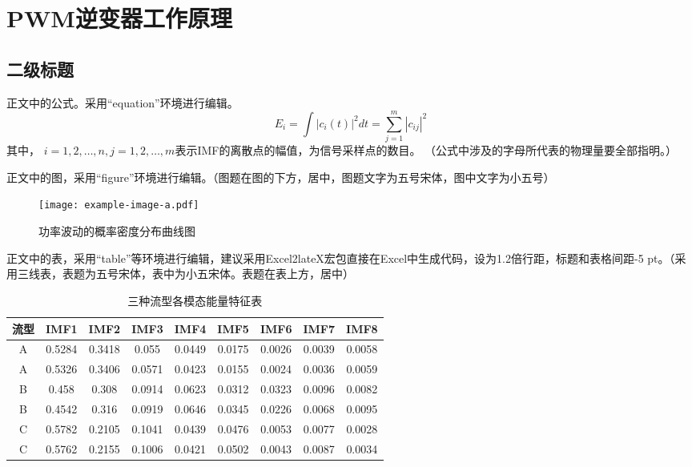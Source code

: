 \renewcommand{\baselinestretch}{1.5}
\section{PWM逆变器工作原理}
\subsection{二级标题}
正文中的公式。采用“equation”环境进行编辑。
\begin{equation}
E_i = \int|c_i(t)|^2 dt = \sum_{j=1}^{m}|c_{ij}|^2
\end{equation}
其中， $i =1,2,\dots,n,j=1,2,\dots,m$表示IMF的离散点的幅值，为信号采样点的数目。
（公式中涉及的字母所代表的物理量要全部指明。）\par
正文中的图，采用“figure”环境进行编辑。（图题在图的下方，居中，图题文字为五号宋体，图中文字为小五号）\par
\begin{figure}[htbp]
\centering
\texttt{[image: example-image-a.pdf]}
\caption{功率波动的概率密度分布曲线图}     \label{fig1}
\end{figure}

正文中的表，采用“table”等环境进行编辑，建议采用Excel2lateX宏包直接在Excel中生成代码，设为1.2倍行距，标题和表格间距-5 pt。（采用三线表，表题为五号宋体，表中为小五宋体。表题在表上方，居中）
\begin{table}[htbp]
  \centering
  \caption{三种流型各模态能量特征表}
  \vspace{-5pt}
  \begin{spacing}{1.2}
    \begin{tabular}{ccccccccc}
    \hline
    流型    & IMF1  & IMF2  & IMF3  & IMF4  & IMF5  & IMF6  & IMF7  & IMF8 \bigstrut\\
    \hline
    A     & 0.5284 & 0.3418 & 0.055 & 0.0449 & 0.0175 & 0.0026 & 0.0039 & 0.0058 \bigstrut[t]\\
    A     & 0.5326 & 0.3406 & 0.0571 & 0.0423 & 0.0155 & 0.0024 & 0.0036 & 0.0059 \\
    B     & 0.458 & 0.308 & 0.0914 & 0.0623 & 0.0312 & 0.0323 & 0.0096 & 0.0082 \\
    B     & 0.4542 & 0.316 & 0.0919 & 0.0646 & 0.0345 & 0.0226 & 0.0068 & 0.0095 \\
    C     & 0.5782 & 0.2105 & 0.1041 & 0.0439 & 0.0476 & 0.0053 & 0.0077 & 0.0028 \\
    C     & 0.5762 & 0.2155 & 0.1006 & 0.0421 & 0.0502 & 0.0043 & 0.0087 & 0.0034 \bigstrut[b]\\
    \hline
    \end{tabular}%
  \end{spacing}
  \label{tab:addlabel}%
\end{table}%
